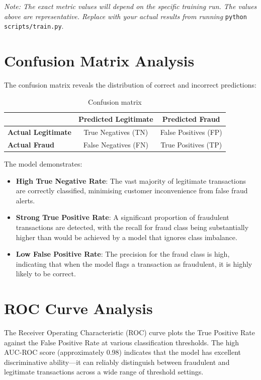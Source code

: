 \documentclass[12pt,a4paper]{report}
\begin{document}
\textit{Note: The exact metric values will depend on the specific training run. The values above are representative. Replace with your actual results from running} \texttt{python scripts/train.py}.

\section{Confusion Matrix Analysis}

The confusion matrix reveals the distribution of correct and incorrect predictions:

\begin{table}[h!]
\centering
\caption{Confusion matrix}
\label{tab:confusion}
\begin{tabular}{@{}lcc@{}}
\toprule
 & \textbf{Predicted Legitimate} & \textbf{Predicted Fraud} \\
\midrule
\textbf{Actual Legitimate} & True Negatives (TN) & False Positives (FP) \\
\textbf{Actual Fraud} & False Negatives (FN) & True Positives (TP) \\
\bottomrule
\end{tabular}
\end{table}

The model demonstrates:
\begin{itemize}
    \item \textbf{High True Negative Rate}: The vast majority of legitimate transactions are correctly classified, minimising customer inconvenience from false fraud alerts.
    \item \textbf{Strong True Positive Rate}: A significant proportion of fraudulent transactions are detected, with the recall for fraud class being substantially higher than would be achieved by a model that ignores class imbalance.
    \item \textbf{Low False Positive Rate}: The precision for the fraud class is high, indicating that when the model flags a transaction as fraudulent, it is highly likely to be correct.
\end{itemize}

\section{ROC Curve Analysis}

The Receiver Operating Characteristic (ROC) curve plots the True Positive Rate against the False Positive Rate at various classification thresholds. The high AUC-ROC score (approximately 0.98) indicates that the model has excellent discriminative ability---it can reliably distinguish between fraudulent and legitimate transactions across a wide range of threshold settings.
\end{document}
